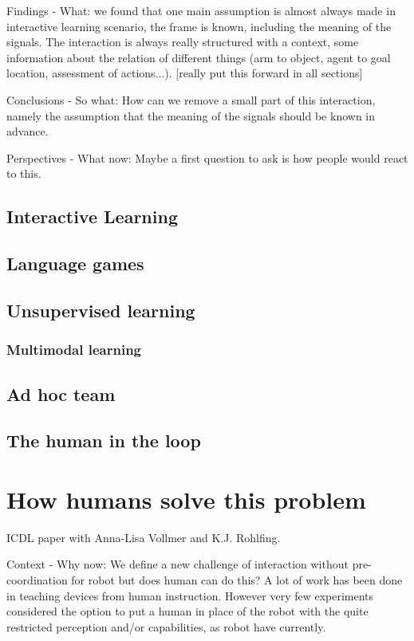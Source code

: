 Findings - What: we found that one main assumption is almost always made in interactive learning scenario, the frame is known, including the meaning of the signals. The interaction is always really structured with a context, some information about the relation of different things (arm to object, agent to goal location, assessment of actions...). [really put this forward in all sections]

Conclusions - So what: How can we remove a small part of this interaction, namely the assumption that the meaning of the signals should be known in advance.

Perspectives - What now: Maybe a first question to ask is how people would react to this.

\section{Interactive Learning}

\section{Language games}

\section{Unsupervised learning}

\subsection{Multimodal learning}

\section{Ad hoc team}

\section{The human in the loop}

\chapter{How humans solve this problem}
\minitoc

ICDL paper with Anna-Lisa Vollmer and K.J. Rohlfing.

Context - Why now: We define a new challenge of interaction without pre-coordination for robot but does human can do this? A lot of work has been done in teaching devices from human instruction. However very few experiments considered the option to put a human in place of the robot with the quite restricted perception and/or capabilities, as robot have currently.

